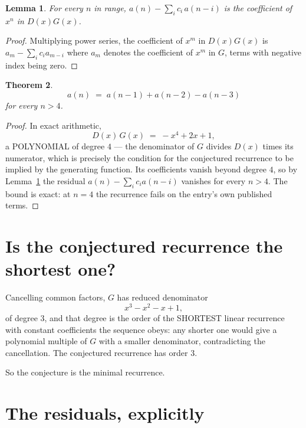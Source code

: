 \documentclass[11pt,a4paper]{article}
\theoremstyle{plain}
\newtheorem{theorem}{Theorem}
\newtheorem{lemma}[theorem]{Lemma}
\theoremstyle{definition}
\begin{document}
\begin{lemma}\label{lem:key}
For every $n$ in range, $a(n)-\sum_i c_i\,a(n-i)$ is the coefficient of $x^{n}$ in
$D(x)G(x)$.
\end{lemma}

\begin{proof}
Multiplying power series, the coefficient of $x^{m}$ in $D(x)G(x)$ is
$a_m-\sum_i c_i a_{m-i}$ where $a_m$ denotes the coefficient of $x^{m}$ in $G$, terms with
negative index being zero.
\end{proof}

\begin{theorem}
\[
a(n)\;=\;a(n-1) + a(n-2) - a(n-3)
\]
for every $n>4$.
\end{theorem}

\begin{proof}
In exact arithmetic,
\[
D(x)\,G(x)\;=\;- x^{4} + 2 x + 1,
\]
a POLYNOMIAL of degree $4$ --- the denominator of $G$ divides $D(x)$ times its numerator,
which is precisely the condition for the conjectured recurrence to be implied by the
generating function. Its coefficients vanish beyond degree $4$, so by
Lemma~\ref{lem:key} the residual $a(n)-\sum_ic_ia(n-i)$ vanishes for every
$n>4$. The bound is exact: at $n=4$ the recurrence fails on the entry's own published terms.
\end{proof}

\section{Is the conjectured recurrence the shortest one?}

Cancelling common factors, $G$ has reduced denominator
\[
x^{3} - x^{2} - x + 1,
\]
of degree $3$, and that degree is the order of the SHORTEST linear recurrence with
constant coefficients the sequence obeys: any shorter one would give a polynomial multiple of
$G$ with a smaller denominator, contradicting the cancellation. The conjectured recurrence has
order $3$.

So the conjecture is the minimal recurrence.

\section{The residuals, explicitly}
\end{document}
